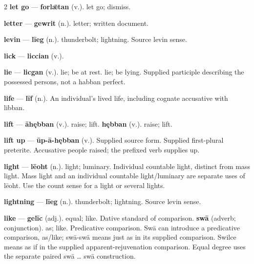 \begin{multicols}{2}
\textbf{let go} — \textbf{forlǣtan} (v.). let go; dismiss.\par
\textbf{letter} — \textbf{gewrit} (n.). letter; written document.\par
\textbf{levin} — \textbf{līeg} (n.). thunderbolt; lightning. Source levin sense.\par
\textbf{lick} — \textbf{liccian} (v.).\par
\textbf{lie} — \textbf{licgan} (v.). lie; be at rest. lie; be lying. Supplied participle describing the possessed persons, not a habban perfect.\par
\textbf{life} — \textbf{līf} (n.). An individual's lived life, including cognate accusative with libban.\par
\textbf{lift} — \textbf{āhębban} (v.). raise; lift. \textbf{hębban} (v.). raise; lift.\par
\textbf{lift up} — \textbf{ūp-ā-hębban} (v.). Supplied source form. Supplied first-plural preterite. Accusative people raised; the prefixed verb supplies up.\par
\textbf{light} — \textbf{lēoht} (n.). light; luminary. Individual countable light, distinct from mass light. Mass light and an individual countable light/luminary are separate uses of lēoht. Use the count sense for a light or several lights.\par
\textbf{lightning} — \textbf{līeg} (n.). thunderbolt; lightning. Source levin sense.\par
\textbf{like} — \textbf{gelīc} (adj.). equal; like. Dative standard of comparison. \textbf{swā} (adverb; conjunction). as; like. Predicative comparison. Swā can introduce a predicative comparison, as/like; swā-swā means just as in its supplied comparison. Swilce means as if in the supplied apparent-rejuvenation comparison. Equal degree uses the separate paired swā … swā construction.\par

\end{multicols}
